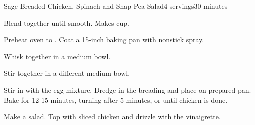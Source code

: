 \documentclass[../Cookbook.tex]{subfiles}
\begin{document}
\begin{recipe}{Sage-Breaded Chicken, Spinach and Snap Pea Salad}{4 servings}{30 minutes}

Blend together until smooth. Makes  cup.

Preheat oven to . Coat a 15-inch baking pan with nonstick spray.

Whisk together in a medium bowl.

Stir together in a different medium bowl.

Stir in with the egg mixture. Dredge in the breading and place on prepared pan. Bake for 12-15 minutes, turning after 5 minutes, or until chicken is done.

Make a salad. Top with sliced chicken and drizzle with the vinaigrette.

\end{recipe}
\end{document}
